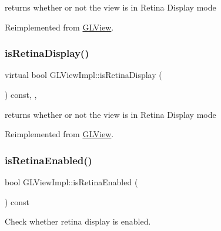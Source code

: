 returns whether or not the view is in Retina Display mode 

Reimplemented from \hyperlink{classGLView_a6b51811c80d053326246f2f318010edc}{G\+L\+View}.

\mbox{\label{classGLViewImpl_a3c02a8e95e8f2ee4821935f78be3f6b0}} 
\subsubsection{\texorpdfstring{is\+Retina\+Display()}{isRetinaDisplay()}\hspace{0.1cm}{\footnotesize\ttfamily [2/2]}}
{\footnotesize\ttfamily virtual bool G\+L\+View\+Impl\+::is\+Retina\+Display (\begin{DoxyParamCaption}{ }\end{DoxyParamCaption}) const\hspace{0.3cm}{\ttfamily [inline]}, {\ttfamily [override]}, {\ttfamily [virtual]}}

returns whether or not the view is in Retina Display mode 

Reimplemented from \hyperlink{classGLView_a6b51811c80d053326246f2f318010edc}{G\+L\+View}.

\mbox{\label{classGLViewImpl_ab05ff2acc127d3eaeacefd9a5b116550}} 
\subsubsection{\texorpdfstring{is\+Retina\+Enabled()}{isRetinaEnabled()}\hspace{0.1cm}{\footnotesize\ttfamily [1/2]}}
{\footnotesize\ttfamily bool G\+L\+View\+Impl\+::is\+Retina\+Enabled (\begin{DoxyParamCaption}{ }\end{DoxyParamCaption}) const\hspace{0.3cm}{\ttfamily [inline]}}

Check whether retina display is enabled. \mbox{\label{classGLViewImpl_ab05ff2acc127d3eaeacefd9a5b116550}} 
